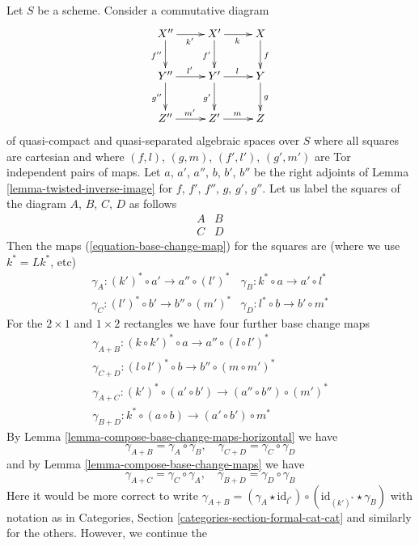 \begin{remark}
\label{remark-going-around}
Let $S$ be a scheme. Consider a commutative diagram
$$
\xymatrix{
X'' \ar[r]_{k'} \ar[d]_{f''} & X' \ar[r]_k \ar[d]_{f'} & X \ar[d]^f \\
Y'' \ar[r]^{l'} \ar[d]_{g''} & Y' \ar[r]^l \ar[d]_{g'} & Y \ar[d]^g \\
Z'' \ar[r]^{m'} & Z' \ar[r]^m & Z
}
$$
of quasi-compact and quasi-separated algebraic spaces over $S$ where
all squares are cartesian and where
$(f, l)$, $(g, m)$, $(f', l')$, $(g', m')$ are
Tor independent pairs of maps.
Let $a$, $a'$, $a''$, $b$, $b'$, $b''$ be the
right adjoints of Lemma \ref{lemma-twisted-inverse-image}
for $f$, $f'$, $f''$, $g$, $g'$, $g''$.
Let us label the squares of the diagram $A$, $B$, $C$, $D$
as follows
$$
\begin{matrix}
A & B \\
C & D
\end{matrix}
$$
Then the maps (\ref{equation-base-change-map})
for the squares are (where we use $k^* = Lk^*$, etc)
$$
\begin{matrix}
\gamma_A : (k')^* \circ a' \to a'' \circ (l')^* &
\gamma_B : k^* \circ a \to a' \circ l^* \\
\gamma_C : (l')^* \circ b' \to b'' \circ (m')^* &
\gamma_D : l^* \circ b \to b' \circ m^*
\end{matrix}
$$
For the $2 \times 1$ and $1 \times 2$ rectangles we have four further
base change maps
$$
\begin{matrix}
\gamma_{A + B} : (k \circ k')^* \circ a \to a'' \circ (l \circ l')^* \\
\gamma_{C + D} : (l \circ l')^* \circ b \to b'' \circ (m \circ m')^* \\
\gamma_{A + C} : (k')^* \circ (a' \circ b') \to (a'' \circ b'') \circ (m')^* \\
\gamma_{B + D} : k^* \circ (a \circ b) \to (a' \circ b') \circ m^*
\end{matrix}
$$
By Lemma \ref{lemma-compose-base-change-maps-horizontal} we have
$$
\gamma_{A + B} = \gamma_A \circ \gamma_B, \quad
\gamma_{C + D} = \gamma_C \circ \gamma_D
$$
and by Lemma \ref{lemma-compose-base-change-maps} we have
$$
\gamma_{A + C} = \gamma_C \circ \gamma_A, \quad
\gamma_{B + D} = \gamma_D \circ \gamma_B
$$
Here it would be more correct to write
$\gamma_{A + B} = (\gamma_A \star \text{id}_{l^*}) \circ
(\text{id}_{(k')^*} \star \gamma_B)$ with notation as in
Categories, Section \ref{categories-section-formal-cat-cat}
and similarly for the others. However, we continue the

\end{remark}
